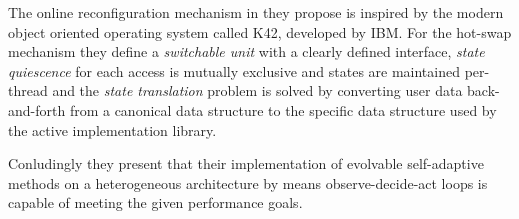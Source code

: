 The online reconfiguration mechanism in \cite{evolvable} they propose is inspired by the modern object oriented operating system called K42, developed by IBM. For the hot-swap mechanism they define a \emph{switchable unit} with a clearly defined interface, \emph{state quiescence} for each access is mutually exclusive and states are maintained per-thread and the \emph{state translation} problem is solved by converting user data back-and-forth from a canonical data structure to the specific data structure used by the active implementation library. 

Conludingly they present that their implementation of evolvable self-adaptive methods on a heterogeneous architecture by means observe-decide-act loops is capable of meeting the given performance goals. 

